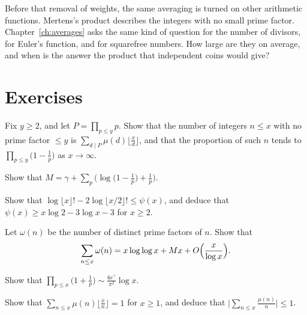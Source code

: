 Before that removal of weights, the same averaging is turned on other arithmetic functions. Mertens's product describes the integers with no small prime factor. Chapter~\ref{ch:averages} asks the same kind of question for the number of divisors, for Euler's function, and for squarefree numbers. How large are they on average, and when is the answer the product that independent coins would give?

\section{Exercises}

\begin{exercise}[$\star$]\label{ex:sieveprob}
Fix $y\ge 2$, and let $P=\prod_{p\le y}p$. Show that the number of integers $n\le x$ with no prime factor $\le y$ is $\sum_{d\mid P}\mu(d)\bigl\lfloor\frac xd\bigr\rfloor$, and that the proportion of such $n$ tends to $\prod_{p\le y}\bigl(1-\frac1p\bigr)$ as $x\to\infty$.
\end{exercise}

\begin{exercise}[$\star$]\label{ex:mertensconst}
Show that $M=\gamma+\sum_p\bigl(\log\bigl(1-\frac1p\bigr)+\frac1p\bigr)$.
\end{exercise}

\begin{exercise}[$\star\star$]\label{ex:chebyshevlower}
Show that $\log\lfloor x\rfloor!-2\log\lfloor x/2\rfloor!\le\psi(x)$, and deduce that $\psi(x)\ge x\log 2-3\log x-3$ for $x\ge 2$.
\end{exercise}

\begin{exercise}[$\star\star$]\label{ex:averageomega}
Let $\omega(n)$ be the number of distinct prime factors of $n$. Show that
\[
\sum_{n\le x}\omega(n)=x\log\log x+Mx+O\Bigl(\frac x{\log x}\Bigr).
\]
\end{exercise}

\begin{exercise}[$\star\star$]\label{ex:plusproduct}
Show that $\prod_{p\le x}\bigl(1+\frac1p\bigr)\sim\frac{6e^\gamma}{\pi^2}\log x$.
\end{exercise}

\begin{exercise}[$\star\star$]\label{ex:mobiusmean}
Show that $\sum_{n\le x}\mu(n)\bigl\lfloor\frac xn\bigr\rfloor=1$ for $x\ge 1$, and deduce that $\bigl|\sum_{n\le x}\frac{\mu(n)}n\bigr|\le 1$.
\end{exercise}

